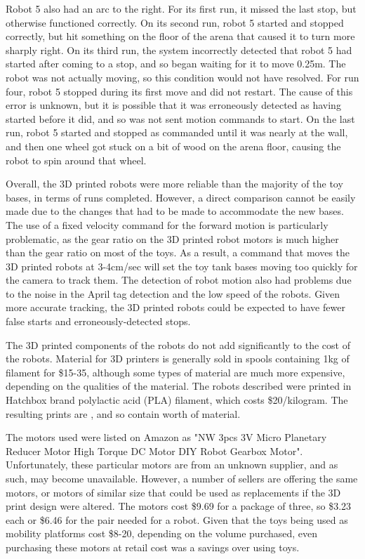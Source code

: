 Robot 5 also had an arc to the right. For its first run, it missed the last stop, but otherwise functioned correctly. 
On its second run, robot 5 started and stopped correctly, but hit something on the floor of the arena that caused it to turn more sharply right. 
On its third run, the system incorrectly detected that robot 5 had started after coming to a stop, and so began waiting for it to move 0.25m. 
The robot was not actually moving, so this condition would not have resolved. 
For run four, robot 5 stopped during its first move and did not restart.
The cause of this error is unknown, but it is possible that it was erroneously detected as having started before it did, and so was not sent motion commands to start. 
On the last run, robot 5 started and stopped as commanded until it was nearly at the wall, and then one wheel got stuck on a bit of wood on the arena floor, causing the robot to spin around that wheel. 

Overall, the 3D printed robots were more reliable than the majority of the toy bases, in terms of runs completed. 
However, a direct comparison cannot be easily made due to the changes that had to be made to accommodate the new bases. 
The use of a fixed velocity command for the forward motion is particularly problematic, as the gear ratio on the 3D printed robot motors is much higher than the gear ratio on most of the toys. 
As a result, a command that moves the 3D printed robots at 3-4cm/sec will set the toy tank bases moving too quickly for the camera to track them. 
The detection of robot motion also had problems due to the noise in the April tag detection and the low speed of the robots. 
Given more accurate tracking, the 3D printed robots could be expected to have fewer false starts and erroneously-detected stops. 

The 3D printed components of the robots do not add significantly to the cost of the robots. 
Material for 3D printers is generally sold in spools containing 1kg of filament for \$15-35, although some types of material are much more expensive, depending on the qualities of the material.
The robots described were printed in Hatchbox brand polylactic acid (PLA) filament, which costs \$20/kilogram. 
The resulting prints are , and so contain  worth of material. 

The motors used were listed on Amazon as "NW 3pcs 3V Micro Planetary Reducer Motor High Torque DC Motor DIY Robot Gearbox Motor". 
Unfortunately, these particular motors are from an unknown supplier, and as such, may become unavailable. 
However, a number of sellers are offering the same motors, or motors of similar size that could be used as replacements if the 3D print design were altered. 
The motors cost \$9.69 for a package of three, so \$3.23 each or \$6.46 for the pair needed for a robot. 
Given that the toys being used as mobility platforms cost \$8-20, depending on the volume purchased, even purchasing these motors at retail cost was a savings over using toys. 

